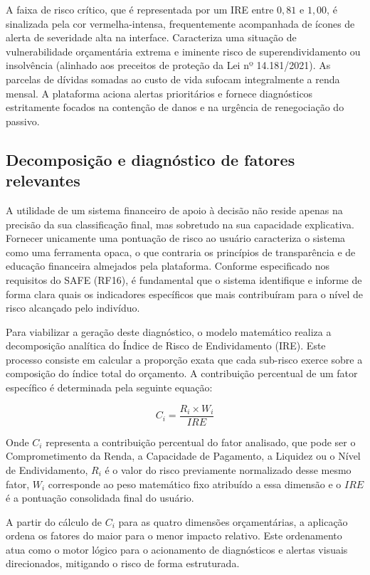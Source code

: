 \documentclass[portuguese]{sbc2025}%
\begin{document}
A faixa de risco crítico, que é representada por um IRE entre $0{,}81$ e $1{,}00$, é sinalizada pela cor vermelha-intensa, frequentemente acompanhada de ícones de alerta de severidade alta na interface. Caracteriza uma situação de vulnerabilidade orçamentária extrema e iminente risco de superendividamento ou insolvência (alinhado aos preceitos de proteção da Lei nº 14.181/2021). As parcelas de dívidas somadas ao custo de vida sufocam integralmente a renda mensal. A plataforma aciona alertas prioritários e fornece diagnósticos estritamente focados na contenção de danos e na urgência de renegociação do passivo.

\subsection{Decomposição e diagnóstico de fatores relevantes}

A utilidade de um sistema financeiro de apoio à decisão não reside apenas na precisão da sua classificação final, mas sobretudo na sua capacidade explicativa. Fornecer unicamente uma pontuação de risco ao usuário caracteriza o sistema como uma ferramenta opaca, o que contraria os princípios de transparência e de educação financeira almejados pela plataforma. Conforme especificado nos requisitos do SAFE (RF16), é fundamental que o sistema identifique e informe de forma clara quais os indicadores específicos que mais contribuíram para o nível de risco alcançado pelo indivíduo.

Para viabilizar a geração deste diagnóstico, o modelo matemático realiza a decomposição analítica do Índice de Risco de Endividamento (IRE). Este processo consiste em calcular a proporção exata que cada sub-risco exerce sobre a composição do índice total do orçamento. A contribuição percentual de um fator específico é determinada pela seguinte equação:

\begin{equation}
C_i = \frac{R_i \times W_i}{IRE}
\end{equation}

Onde $C_i$ representa a contribuição percentual do fator analisado, que pode ser o Comprometimento da Renda, a Capacidade de Pagamento, a Liquidez ou o Nível de Endividamento, $R_i$ é o valor do risco previamente normalizado desse mesmo fator, $W_i$ corresponde ao peso matemático fixo atribuído a essa dimensão e o $IRE$ é a pontuação consolidada final do usuário.

A partir do cálculo de $C_i$ para as quatro dimensões orçamentárias, a aplicação ordena os fatores do maior para o menor impacto relativo. Este ordenamento atua como o motor lógico para o acionamento de diagnósticos e alertas visuais direcionados, mitigando o risco de forma estruturada.
\end{document}
